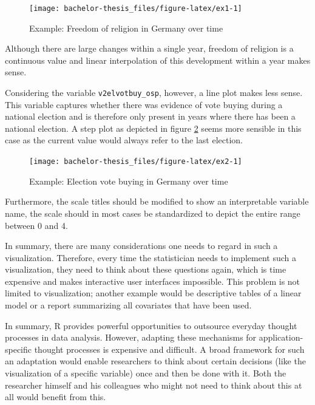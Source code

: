 \documentclass[]{report}
\theoremstyle{definition}
\theoremstyle{definition}
\theoremstyle{definition}
\theoremstyle{remark}
\begin{document}
\begin{figure}

{\centering \texttt{[image: bachelor-thesis\_files/figure-latex/ex1-1]} 

}

\caption{Example: Freedom of religion in Germany over time}\label{fig:ex1}
\end{figure}

Although there are large changes within a single year, freedom of
religion is a continuous value and linear interpolation of this
development within a year makes sense.

Considering the variable \texttt{v2elvotbuy\_osp}, however, a line plot
makes less sense. This variable captures whether there was evidence of
vote buying during a national election and is therefore only present in
years where there has been a national election. A step plot as depicted
in figure \ref{fig:ex2} seems more sensible in this case as the current
value would always refer to the last election.

\begin{figure}

{\centering \texttt{[image: bachelor-thesis\_files/figure-latex/ex2-1]} 

}

\caption{Example: Election vote buying in Germany over time}\label{fig:ex2}
\end{figure}

Furthermore, the scale titles should be modified to show an
interpretable variable name, the scale should in most cases be
standardized to depict the entire range between 0 and 4.

In summary, there are many considerations one needs to regard in such a
visualization. Therefore, every time the statistician needs to implement
such a visualization, they need to think about these questions again,
which is time expensive and makes interactive user interfaces
impossible. This problem is not limited to visualization; another
example would be descriptive tables of a linear model or a report
summarizing all covariates that have been used.

In summary, R provides powerful opportunities to outsource everyday
thought processes in data analysis. However, adapting these mechanisms
for application-specific thought processes is expensive and difficult. A
broad framework for such an adaptation would enable researchers to think
about certain decisions (like the visualization of a specific variable)
once and then be done with it. Both the researcher himself and his
colleagues who might not need to think about this at all would benefit
from this.
\end{document}

